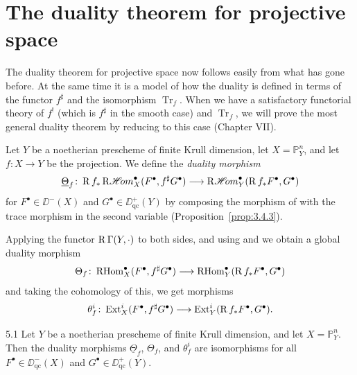 \section{The duality theorem for projective space}\label{sec:3.5}

The duality theorem for projective space now follows easily from what has gone before. At the same time it is a model of how the duality is defined in terms of the functor $f^{\sharp}$ and the isomorphism $\operatorname{Tr}_f$. When we have a satisfactory functorial theory of $f^!$ (which is $f^{\sharp}$ in the smooth case) and $\operatorname{Tr}_f$, we will prove the most general duality theorem by reducing to this case (Chapter VII).

Let $Y$ be a noetherian prescheme of finite Krull dimension, let $X=\mathbb{P}^n_Y$, and let $f\colon X\to Y$ be the projection. We define the \emph{duality morphism}
\[
\underline{\Theta}_f\colon \operatorname{R} f_* \mathop{\mathrm{R}\mathscr{H}\!om}\nolimits_X^\bullet(F^\bullet, f^{\sharp}G^\bullet) \longrightarrow \mathop{\mathrm{R}\mathscr{H}\!om}\nolimits_Y^\bullet(\operatorname{R} f_*F^\bullet, G^\bullet)
\]
for $F^\bullet\in\DD^-(X)$ and $G^\bullet\in\DD_{\mathrm{qc}}^+(Y)$ by composing the morphism of  with the trace morphism in the second variable (Proposition~\ref{prop:3.4.3}).

Applying the functor $\operatorname{R}\Gamma(Y,\cdot)$ to both sides, and using  and  we obtain a global duality morphism
\[
\Theta_f \colon \operatorname{RHom}_X^\bullet(F^\bullet, f^{\sharp}G^\bullet) \longrightarrow \operatorname{RHom}_Y^\bullet(\operatorname{R} f_*F^\bullet, G^\bullet)
\]
and taking the cohomology of this, we get morphisms
\[
\theta_f^i \colon \operatorname{Ext}_X^i(F^\bullet,f^{\sharp}G^\bullet) \longrightarrow \operatorname{Ext}_Y^i(\operatorname{R} f_*F^\bullet,G^\bullet).
\]

\begin{booktheorem}{5.1}\label{thm:3.5.1}
Let $Y$ be a noetherian prescheme of finite Krull dimension, and let $X=\mathbb{P}^n_Y$. Then the duality morphisms $\underline{\Theta}_f$, $\Theta_f$, and $\theta_f^i$ are isomorphisms for all $F^\bullet\in\DD_{\mathrm{qc}}^-(X)$ and $G^\bullet\in\DD_{\mathrm{qc}}^+(Y)$.
\end{booktheorem}

